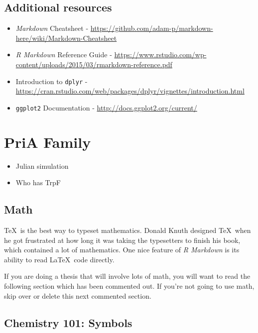 \documentclass[12pt,twoside]{reedthesis}
\providecommand{\tightlist}{%
  \setlength{\itemsep}{0pt}\setlength{\parskip}{0pt}}
\begin{document}
  \section{Additional resources}\label{additional-resources}
  
  \begin{itemize}
  \item
    \emph{Markdown} Cheatsheet -
    \url{https://github.com/adam-p/markdown-here/wiki/Markdown-Cheatsheet}
  \item
    \emph{R Markdown} Reference Guide -
    \url{https://www.rstudio.com/wp-content/uploads/2015/03/rmarkdown-reference.pdf}
  \item
    Introduction to \texttt{dplyr} -
    \url{https://cran.rstudio.com/web/packages/dplyr/vignettes/introduction.html}
  \item
    \texttt{ggplot2} Documentation -
    \url{http://docs.ggplot2.org/current/}
  \end{itemize}
  
  \chapter{PriA Family}\label{math-sci}
  
  \begin{itemize}
  \tightlist
  \item
    Julian simulation
  \item
    Who has TrpF
  \end{itemize}
  
  \hypertarget{math}{\section{Math}\label{math}}
  
  \TeX~is the best way to typeset mathematics. Donald Knuth designed
  \TeX~when he got frustrated at how long it was taking the typesetters to
  finish his book, which contained a lot of mathematics. One nice feature
  of \emph{R Markdown} is its ability to read \LaTeX~code directly.
  
  If you are doing a thesis that will involve lots of math, you will want
  to read the following section which has been commented out. If you're
  not going to use math, skip over or delete this next commented section.
  
  \section{Chemistry 101: Symbols}\label{chemistry-101-symbols}
  
\end{document}
